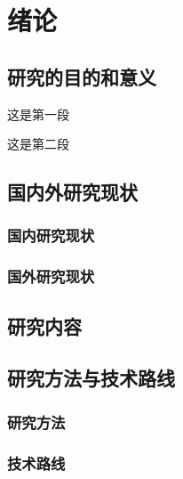\documentclass[a4paper, oneside]{ctexbook}
\begin{document}
	\tableofcontents	%
	
	\chapter{绪论}		%
		\section{研究的目的和意义}
			这是第一段
		  
			这是第二段
		\section{国内外研究现状}
			\subsection{国内研究现状}
			\subsection{国外研究现状}
		\section{研究内容}
		\section{研究方法与技术路线}
			\subsection{研究方法}
			\subsection{技术路线}
\end{document}
